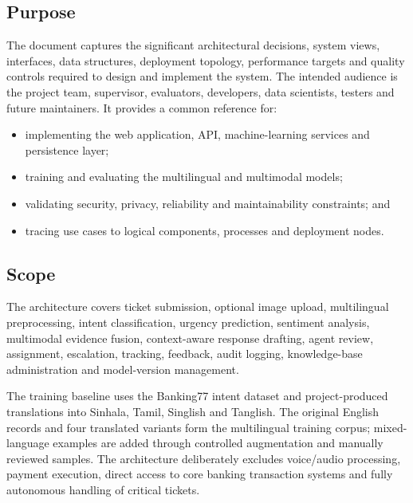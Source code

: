 \documentclass[10pt,letterpaper]{article}
\begin{document}
\subsection{Purpose}
The document captures the significant architectural decisions, system views, interfaces, data structures, deployment topology, performance targets and quality controls required to design and implement the system. The intended audience is the project team, supervisor, evaluators, developers, data scientists, testers and future maintainers. It provides a common reference for:
\begin{itemize}
  \item implementing the web application, API, machine-learning services and persistence layer;
  \item training and evaluating the multilingual and multimodal models;
  \item validating security, privacy, reliability and maintainability constraints; and
  \item tracing use cases to logical components, processes and deployment nodes.
\end{itemize}

\subsection{Scope}
The architecture covers ticket submission, optional image upload, multilingual preprocessing, intent classification, urgency prediction, sentiment analysis, multimodal evidence fusion, context-aware response drafting, agent review, assignment, escalation, tracking, feedback, audit logging, knowledge-base administration and model-version management.

The training baseline uses the Banking77 intent dataset and project-produced translations into Sinhala, Tamil, Singlish and Tanglish. The original English records and four translated variants form the multilingual training corpus; mixed-language examples are added through controlled augmentation and manually reviewed samples. The architecture deliberately excludes voice/audio processing, payment execution, direct access to core banking transaction systems and fully autonomous handling of critical tickets.
\end{document}
